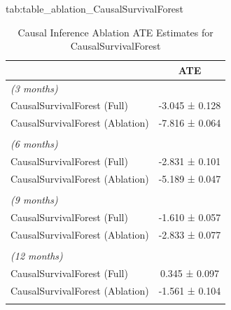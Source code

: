 \begin{table}[hbtp]
    \setlength{\tabcolsep}{4pt}
    \footnotesize
    \floatconts
      {tab:table_ablation_CausalSurvivalForest}
      {\caption{Causal Inference Ablation ATE Estimates for CausalSurvivalForest}}
      {\begin{tabular}{l c }
    \toprule
    &ATE \\
    \midrule
    \textit{(3 months)}
 \\
    CausalSurvivalForest (Full) & -3.045 ± 0.128 \\
    CausalSurvivalForest (Ablation) & -7.816 ± 0.064 \\\\
    \textit{(6 months)}
 \\
    CausalSurvivalForest (Full) & -2.831 ± 0.101 \\
    CausalSurvivalForest (Ablation) & -5.189 ± 0.047 \\\\
    \textit{(9 months)}
 \\
    CausalSurvivalForest (Full) & -1.610 ± 0.057 \\
    CausalSurvivalForest (Ablation) & -2.833 ± 0.077 \\\\
    \textit{(12 months)}
 \\
    CausalSurvivalForest (Full) & 0.345 ± 0.097 \\
    CausalSurvivalForest (Ablation) & -1.561 ± 0.104 \\\\
    \bottomrule
    \end{tabular}}
\end{table}
